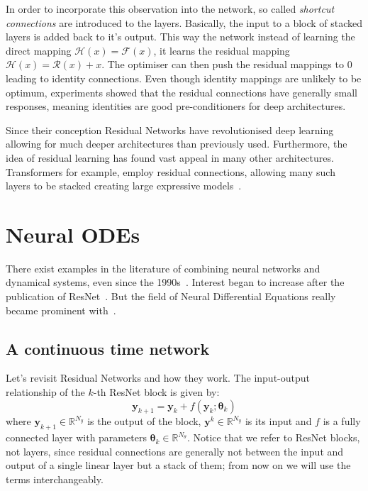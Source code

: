 \documentclass[11pt]{article}
\begin{document}
    In order to incorporate this observation into the network, so called \textit{shortcut connections} are introduced to the layers.
    Basically, the input to a block of stacked layers is added back to it's output.
    This way the network instead of learning the direct mapping $\mathcal{H}(x) = \mathcal{F}(x)$, it learns the residual mapping $\mathcal{H}(x) = \mathcal{R}(x)+x$.
    The optimiser can then push the residual mappings to $0$ leading to identity connections.
    Even though identity mappings are unlikely to be optimum, experiments showed that the residual connections have generally small responses, meaning identities are good pre-conditioners for deep architectures.

    Since their conception Residual Networks have revolutionised deep learning allowing for much deeper architectures than previously used.
    Furthermore, the idea of residual learning has found vast appeal in many other architectures.
    Transformers for example, employ residual connections, allowing many such layers to be stacked creating large expressive models~\cite{vaswani2017attention}.


    \section{Neural ODEs}
    There exist examples in the literature of combining neural networks and dynamical systems, even since the 1990s~\cite{rico1992discrete}.
    Interest began to increase after the publication of ResNet~\cite{weinan2018mean}.
    But the field of Neural Differential Equations really became prominent with~\cite{chen2018neural}.

    \subsection{A continuous time network}
    Let's revisit Residual Networks and how they work.
    The input-output relationship of the $k$-th ResNet block is given by:
    \begin{equation}
        \pmb{y}_{k+1} = \pmb{y}_{k} + f(\pmb{y}_{k}; \pmb{\theta}_k) \label{resnet}
    \end{equation}
    where $\pmb{y}_{k+1} \in \mathbb{R}^{N_y}$ is the output of the block, $\pmb{y}^{k} \in \mathbb{R}^{N_y}$ is its input and $f$ is a fully connected layer with parameters $\pmb{\theta}_k \in \mathbb{R}^{N_\theta}$.
    Notice that we refer to ResNet blocks, not layers, since residual connections are generally not between the input and output of a single linear layer but a stack of them; from now on we will use the terms interchangeably.
\end{document}
